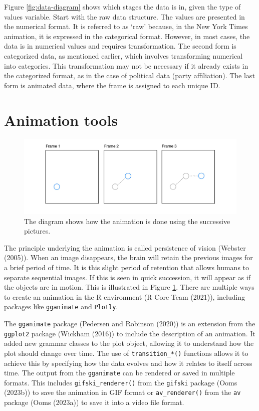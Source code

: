 Figure \ref{fig:data-diagram} shows which stages the data is in, given the type of values variable. Start with the raw data structure. The values are presented in the numerical format. It is referred to as `raw' because, in the New York Times animation, it is expressed in the categorical format. However, in most cases, the data is in numerical values and requires transformation. The second form is categorized data, as mentioned earlier, which involves transforming numerical into categories.
This transformation may not be necessary if it already exists in the categorized format, as in the case of political data (party affiliation). The last form is animated data, where the frame is assigned to each unique ID.

\hypertarget{animation-tools}{%
\section{Animation tools}\label{animation-tools}}

\begin{figure}

{\centering \includegraphics[width=1\linewidth]{figures/animation-diagram} 

}

\caption{The diagram shows how the animation is done using the successive pictures.}\label{fig:animation-diagram}
\end{figure}

The principle underlying the animation is called persistence of vision (Webster (2005)). When an image disappears, the brain will retain the previous images for a brief period of time. It is this slight period of retention that allows humans to separate sequential images. If this is seen in quick succession, it will appear as if the objects are in motion. This is illustrated in Figure \ref{fig:animation-diagram}. There are multiple ways to create an animation in the R environment (R Core Team (2021)), including packages like \texttt{gganimate} and \texttt{Plotly}.

The \texttt{gganimate} package (Pedersen and Robinson (2020)) is an extension from the \texttt{ggplot2} package (Wickham (2016)) to include the description of an animation. It added new grammar classes to the plot object, allowing it to understand how the plot should change over time. The use of \texttt{transition\_*()} functions allows it to achieve this by specifying how the data evolves and how it relates to itself across time. The output from the \texttt{gganimate} can be rendered or saved in multiple formats. This includes \texttt{gifski\_renderer()} from the \texttt{gifski} package (Ooms (2023b)) to save the animation in GIF format or \texttt{av\_renderer()} from the \texttt{av} package (Ooms (2023a)) to save it into a video file format.

